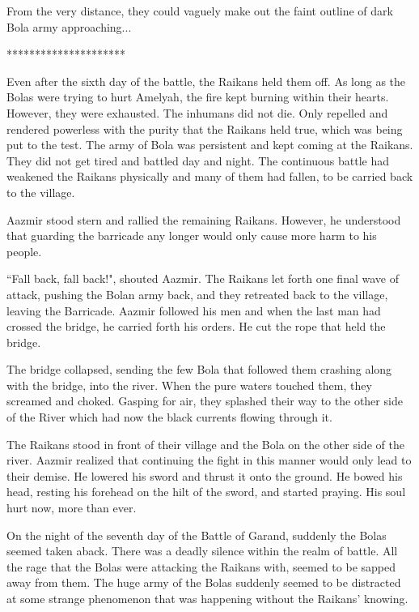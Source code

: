 \documentclass[twoside,11pt,titlepage]{article}
\begin{document}
From the very distance, they could vaguely make out the faint outline of dark Bola army approaching...

\bigskip
\begin{center}
*********************
\end{center}

Even after the sixth day of the battle, the Raikans held them off. As long as the Bolas were trying to hurt Amelyah, the fire kept burning within their hearts. However, they were exhausted. The inhumans did not die. Only repelled and rendered powerless with the purity that the Raikans held true, which was being put to the test. The army of Bola was persistent and kept coming at the Raikans. They did not get tired and battled day and night. The continuous battle had weakened the Raikans physically and many of them had fallen, to be carried back to the village.

Aazmir stood stern and rallied the remaining Raikans. However, he understood that guarding the barricade any longer would only cause more harm to his people.

``Fall back, fall back!", shouted Aazmir. The Raikans let forth one final wave of attack, pushing the Bolan army back, and they retreated back to the village, leaving the Barricade. Aazmir followed his men and when the last man had crossed the bridge, he carried forth his orders. He cut the rope that held the bridge.

The bridge collapsed, sending the few Bola that followed them crashing along with the bridge, into the river. When the pure waters touched them, they screamed and choked. Gasping for air, they splashed their way to the other side of the River which had now the black currents flowing through it.

The Raikans stood in front of their village and the Bola on the other side of the river. Aazmir realized that continuing the fight in this manner would only lead to their demise. He lowered his sword and thrust it onto the ground. He bowed his head, resting his forehead on the hilt of the sword, and started praying. His soul hurt now, more than ever.

On the night of the seventh day of the Battle of Garand, suddenly the Bolas seemed taken aback. There was a deadly silence within the realm of battle. All the rage that the Bolas were attacking the Raikans with, seemed to be sapped away from them. The huge army of the Bolas suddenly seemed to be distracted at some strange phenomenon that was happening without the Raikans' knowing.
\end{document}
